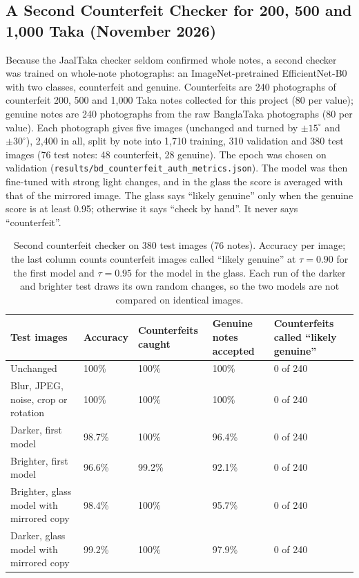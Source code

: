 \subsection{A Second Counterfeit Checker for 200, 500 and 1,000 Taka (November 2026)}
\label{sec:bd_auth}
Because the JaalTaka checker seldom confirmed whole notes, a second checker was trained on whole-note photographs: an ImageNet-pretrained EfficientNet-B0 with two classes, counterfeit and genuine. Counterfeits are 240 photographs of counterfeit 200, 500 and 1,000 Taka notes collected for this project (80 per value); genuine notes are 240 photographs from the raw BanglaTaka photographs (80 per value). Each photograph gives five images (unchanged and turned by $\pm15^\circ$ and $\pm30^\circ$), 2,400 in all, split by note into 1,710 training, 310 validation and 380 test images (76 test notes: 48 counterfeit, 28 genuine). The epoch was chosen on validation (\texttt{results/bd\_counterfeit\_auth\_metrics.json}). The model was then fine-tuned with strong light changes, and in the glass the score is averaged with that of the mirrored image. The glass says ``likely genuine'' only when the genuine score is at least 0.95; otherwise it says ``check by hand''. It never says ``counterfeit''.

\begin{table}[!htbp]
\centering
\caption{Second counterfeit checker on 380 test images (76 notes). Accuracy per image; the last column counts counterfeit images called ``likely genuine'' at $\tau = 0.90$ for the first model and $\tau = 0.95$ for the model in the glass. Each run of the darker and brighter test draws its own random changes, so the two models are not compared on identical images.}
\label{tab:bd_auth}
\small
\begin{tabular}{|L{4.9cm}|C{1.9cm}|C{2.1cm}|C{2.1cm}|C{2.6cm}|}
\hline
\textbf{Test images} & \textbf{Accuracy} & \textbf{Counterfeits caught} & \textbf{Genuine notes accepted} & \textbf{Counterfeits called ``likely genuine''} \\ \hline
Unchanged & 100\% & 100\% & 100\% & 0 of 240 \\ \hline
Blur, JPEG, noise, crop or rotation & 100\% & 100\% & 100\% & 0 of 240 \\ \hline
Darker, first model & 98.7\% & 100\% & 96.4\% & 0 of 240 \\ \hline
Brighter, first model & 96.6\% & 99.2\% & 92.1\% & 0 of 240 \\ \hline
Brighter, glass model with mirrored copy & 98.4\% & 100\% & 95.7\% & 0 of 240 \\ \hline
Darker, glass model with mirrored copy & 99.2\% & 100\% & 97.9\% & 0 of 240 \\ \hline
\end{tabular}
\end{table}

